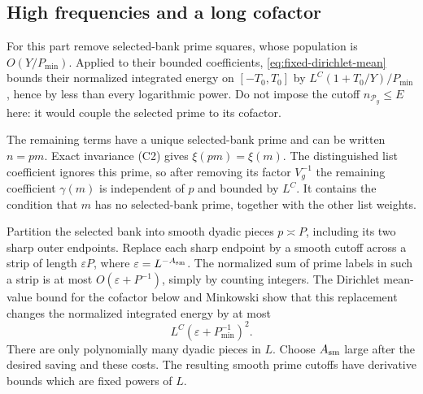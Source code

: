 \subsection{High frequencies and a long cofactor}

For this part remove selected-bank prime squares, whose population
is \(O(Y/P_{\min})\). Applied to their bounded coefficients,
\eqref{eq:fixed-dirichlet-mean} bounds their normalized integrated
energy on \([-T_0,T_0]\) by
\(L^C(1+T_0/Y)/P_{\min}\), hence by less than every logarithmic
power. Do not impose the cutoff \(n_{\mathcal P_y}\le E\) here: it would
couple the selected prime to its cofactor.

The remaining terms have a unique selected-bank prime and can be
written \(n=pm\). Exact invariance \textup{(C2)} gives
\(\xi(pm)=\xi(m)\). The distinguished list coefficient ignores
this prime, so after removing its factor \(V_g^{-1}\) the
remaining coefficient \(\gamma(m)\) is independent of \(p\) and
bounded by \(L^C\). It contains the condition that \(m\) has no
selected-bank prime, together with the other list weights.

Partition the selected bank into smooth dyadic pieces
\(p\asymp P\), including its two sharp outer endpoints. Replace
each sharp endpoint by a smooth cutoff across a strip of length
\(\varepsilon P\), where \(\varepsilon=L^{-A_{\rm sm}}\).
The normalized sum of prime labels in such a strip is at most
\(O(\varepsilon+P^{-1})\), simply by counting integers. The
Dirichlet mean-value bound for the cofactor below and Minkowski
show that this replacement changes the normalized integrated
energy by at most
\[
                  L^C(\varepsilon+P_{\min}^{-1})^2.
\]
There are only polynomially many dyadic pieces in \(L\).
Choose \(A_{\rm sm}\) large after the desired saving and these
costs. The resulting smooth prime cutoffs have derivative bounds
which are fixed powers of \(L\).

